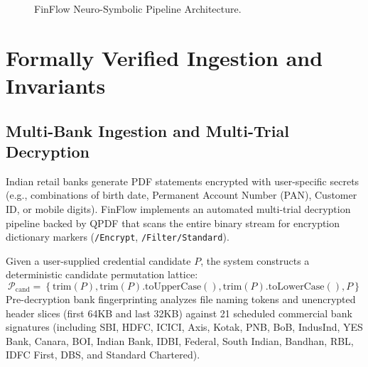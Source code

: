 \documentclass[conference]{IEEEtran}
\begin{document}
\begin{figure}[t]
\centering
{}
\caption{FinFlow Neuro-Symbolic Pipeline Architecture.}
\label{fig:arch}
\end{figure}

\section{Formally Verified Ingestion and Invariants}
\subsection{Multi-Bank Ingestion and Multi-Trial Decryption}
Indian retail banks generate PDF statements encrypted with user-specific secrets (e.g., combinations of birth date, Permanent Account Number (PAN), Customer ID, or mobile digits). FinFlow implements an automated multi-trial decryption pipeline backed by QPDF that scans the entire binary stream for encryption dictionary markers (\texttt{/Encrypt}, \texttt{/Filter/Standard}). 

Given a user-supplied credential candidate $P$, the system constructs a deterministic candidate permutation lattice:
\begin{equation}
\mathcal{P}_{\text{cand}} = \left\{ \text{trim}(P), \text{trim}(P).\text{toUpperCase}(), \text{trim}(P).\text{toLowerCase}(), P \right\}
\end{equation}
Pre-decryption bank fingerprinting analyzes file naming tokens and unencrypted header slices (first 64KB and last 32KB) against 21 scheduled commercial bank signatures (including SBI, HDFC, ICICI, Axis, Kotak, PNB, BoB, IndusInd, YES Bank, Canara, BOI, Indian Bank, IDBI, Federal, South Indian, Bandhan, RBL, IDFC First, DBS, and Standard Chartered).
\end{document}
